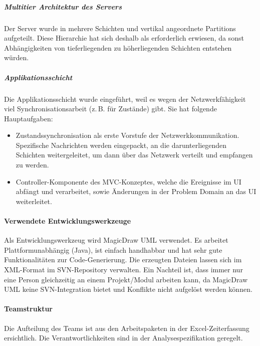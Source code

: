 \documentclass[12pt,halfparskip]{scrartcl}
\begin{document}
\subparagraph{Multitier Architektur des Servers}\label{ssub:multitier_architektur_des_servers} %
Der Server wurde in mehrere Schichten und vertikal angeordnete Partitions aufgeteilt. Diese Hierarchie hat sich deshalb als erforderlich erwiesen, da sonst Abhängigkeiten von tieferliegenden zu höherliegenden Schichten entstehen würden.
\subparagraph{Applikationsschicht}\label{ssub:applikationsschicht} %
Die Applikationsschicht wurde eingeführt, weil es wegen der Netzwerkfähigkeit viel Synchronisationsarbeit (z.\,B. für Zustände) gibt. Sie hat folgende Hauptaufgaben:
	\begin{itemize}
		\item Zustandssynchronisation als erste Vorstufe der Netzwerkkommunikation. Spezifische Nachrichten werden eingepackt, an die darunterliegenden Schichten weitergeleitet, um dann über das Netzwerk verteilt und empfangen zu werden.
		\item Controller-Komponente des MVC-Konzeptes, welche die Ereignisse im UI abfängt und verarbeitet, sowie Änderungen in der Problem Domain an das UI weiterleitet.
	\end{itemize}

\paragraph{Verwendete Entwicklungswerkzeuge}\label{ssub:verwendete_entwicklungswerkzeuge} %
Als Entwicklungswerkzeug wird MagicDraw UML verwendet. Es arbeitet Plattformunabhängig (Java), ist einfach handhabbar und hat sehr gute Funktionalitäten zur Code-Generierung. Die erzeugten Dateien lassen sich im XML-Format im SVN-Repository verwalten. Ein Nachteil ist, dass immer nur eine Person gleichzeitig an einem Projekt/Modul arbeiten kann, da MagicDraw UML keine SVN-Integration bietet und Konflikte nicht aufgelöst werden können.
\paragraph{Teamstruktur}\label{ssub:teamstruktur} %
Die Aufteilung des Teams ist aus den Arbeitspaketen in der Excel-Zeiterfassung ersichtlich. Die Verantwortlichkeiten sind in der Analysespezifikation geregelt.
\end{document}
